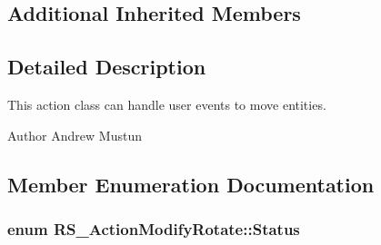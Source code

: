 \subsection*{Additional Inherited Members}


\subsection{Detailed Description}
This action class can handle user events to move entities.

\begin{DoxyAuthor}{Author}
Andrew Mustun 
\end{DoxyAuthor}


\subsection{Member Enumeration Documentation}
\hypertarget{classRS__ActionModifyRotate_a4797d447eb4697d4e5bec7946a650b44}{
\subsubsection[{Status}]{\setlength{\rightskip}{0pt plus 5cm}enum {\bf R\-S\-\_\-\-Action\-Modify\-Rotate\-::\-Status}}}\label{classRS__ActionModifyRotate_a4797d447eb4697d4e5bec7946a650b44}
